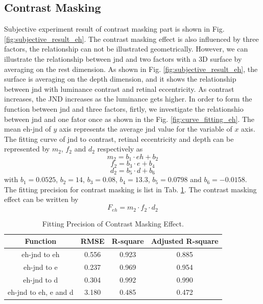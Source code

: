 \documentclass[journal]{IEEEtran}
\begin{document}
\subsection{Contrast Masking}
Subjective experiment result of contrast masking part is shown in Fig. \ref{fig:subjective_result_eh}. The contrast masking effect is also influenced by three factors, the relationship can not be illustrated geometrically. However, we can illustrate the relationship between jnd and two factors with a 3D surface by averaging on the rest dimension. As shown in Fig. \ref{fig:subjective_result_eh}, the surface is averaging on the depth dimension, and it shows the relationship between jnd with luminance contrast and retinal eccentricity. As contrast increases, the JND increases as the luminance gets higher. In order to form the function between jnd and three factors, firtly, we investigate the relationshio between jnd and one fator once as shown in the Fig. \ref{fig:curve_fitting_eh}. The mean eh-jnd of $y$ axis represents the average jnd value for the variable of $x$ axis. The fitting curve of jnd to contrast, retinal eccentricity and depth can be represented by $m_2$, $f_2$ and $d_2$ respectively as
\begin{equation}
m_2=b_1\cdot eh+b_2
\end{equation}
\begin{equation}
f_2=b_3\cdot e+b_4
\end{equation}
\begin{equation}
d_2=b_5\cdot d+b_6
\end{equation}
with $b_1=0.0525$, $b_2=14$, $b_3=0.08$, $b_4=13.3$, $b_5=0.0798$ and $b_6=-0.0158$.
The fitting precision for contrast masking is list in Tab. \ref{tab:fit_precition_eh}. The contrast masking effect can be written by
\begin{equation}
F_{eh}=m_2\cdot f_2 \cdot d_2
\end{equation}
\begin{table}[htbp] 
	\centering
	\caption{Fitting Precision of Contrast Masking Effect.}
	\begin{tabular}{|c|c|c|c|}
		\hline
		Function & RMSE & R-square & Adjusted R-square \\
		\hline
		eh-jnd to eh & 0.556 & 0.923 & 0.885 \\
		\hline
		eh-jnd to e & 0.237 & 0.969 & 0.954 \\
		\hline
		eh-jnd to d & 0.304 & 0.992 & 0.990 \\
		\hline
		eh-jnd to eh, e and d & 3.180 & 0.485 & 0.472 \\
		\hline
	\end{tabular}%
	\label{tab:fit_precition_eh}%
\end{table}%
\end{document}
